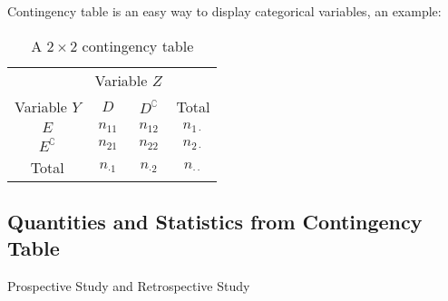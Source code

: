 Contingency table is an easy way to display categorical variables, an example:
\begin{table}[H]
    \centering
    \renewcommand\arraystretch{1}
    \caption{A $ 2\times 2 $ contingency table}
    \begin{tabular}{cccc}
        \hline
        \hline
        &\multicolumn{2}{c}{Variable $ Z $}&\\
        \cline{2-3}
        Variable $ Y $&$ D $&$ D^\complement $&Total\\
        \hline
        $ E $&$ n_{11} $&$ n_{12} $&$ n_{1\cdot } $\\
        $ E^\complement  $&$ n_{21} $&$ n_{22} $&$ n_{2\cdot } $\\
        \hline
        Total&$ n_{\cdot 1} $&$ n_{\cdot 2} $&$ n_{\cdot \cdot } $\\
        \hline
        \hline
    \end{tabular}
    \label{}
\end{table}
      

\subsection{Quantities and Statistics from Contingency Table}\label{SubSubSectionContingencyTableInBioStat}

\begin{point}
    Prospective Study and Retrospective Study
\end{point}

